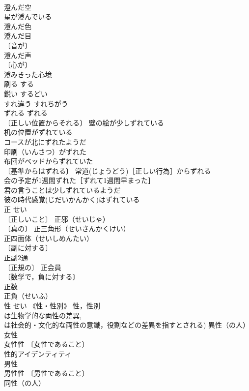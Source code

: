 \documentclass[8pt]{extreport}
\begin{document}
\begin{CJK}{UTF8}{min}
\\	澄んだ空 
\\	星が澄んでいる 
\\	澄んだ色 
\\	澄んだ目 
\\	〔音が〕
\\	澄んだ声 
\\	〔心が〕
\\	澄みきった心境 
\\	刷る	する	
\\	鋭い	するどい	
\\	すれ違う	すれちがう	
\\	ずれる	ずれる	
\\	〔正しい位置からそれる〕 壁の絵が少しずれている 
\\	机の位置がずれている 
\\	コースが北にずれたようだ 
\\	印刷（いんさつ）がずれた 
\\	布団がベッドからずれていた 
\\	〔基準からはずれる〕 常道(じょうどう)［正しい行為］からずれる 
\\	会の予定が1週間ずれた［ずれて1週間早まった］ 
\\	君の言うことは少しずれているようだ 
\\	彼の時代感覚(じだいかんかく)はずれている 
\\	正	せい	
\\	〔正しいこと〕 正邪（せいじゃ） 
\\	〔真の〕 正三角形（せいさんかくけい） 
\\	正四面体（せいしめんたい） 
\\	〔副に対する〕
\\	正副2通 
\\	〔正規の〕 正会員 
\\	〔数学で，負に対する〕
\\	正数 
\\	正負（せいふ） 
\\	性	せい	《性・性別》 性，性別 
\\	は生物学的な両性の差異, 
\\	は社会的・文化的な両性の意識，役割などの差異を指すとされる) 異性（の人） 
\\	女性 
\\	女性性 〔女性であること〕
\\	性的アイデンティティ 
\\	男性 
\\	男性性 〔男性であること〕
\\	同性（の人） 

\end{CJK}
\end{document}

